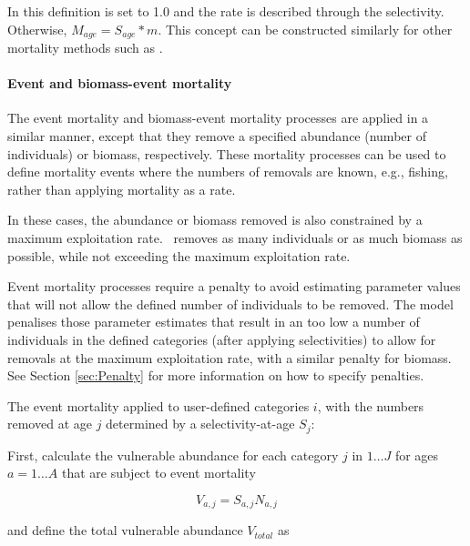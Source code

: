 
In this definition  is set to 1.0 and the rate is described through the selectivity. Otherwise, $M_{age} = S_{age} * m$. This concept can be constructed similarly for other mortality methods such as .

\paragraph{Event and biomass-event mortality}\label{sec:Process-MortalityEvent}\label{sec:Process-MortalityEventBiomass} 


The event mortality and biomass-event mortality processes are applied in a similar manner, except that they remove a specified abundance (number of individuals) or biomass, respectively. These mortality processes can be used to define mortality events where the numbers of removals are known, e.g., fishing, rather than applying mortality as a rate.

In these cases, the abundance or biomass removed is also constrained by a maximum exploitation rate. \CNAME\ removes as many individuals or as much biomass as possible,  while not exceeding the maximum exploitation rate.

Event mortality processes require a penalty to avoid estimating parameter values that will not allow the defined number of individuals to be removed. The model penalises those parameter estimates that result in an too low a number of individuals in the defined categories (after applying selectivities) to allow for removals at the maximum exploitation rate, with a similar penalty for biomass. See Section \ref{sec:Penalty} for more information on how to specify penalties.

The event mortality applied to user-defined categories $i$, with the numbers removed at age $j$ determined by a selectivity-at-age $S_j$:

First, calculate the vulnerable abundance for each category $j$ in $1 \ldots J$ for ages $a = 1 \ldots A$ that are subject to event mortality

\begin{equation}
  V_{a,j} = S_{a,j} N_{a,j}
\end{equation}

and define the total vulnerable abundance $V_{total}$ as

